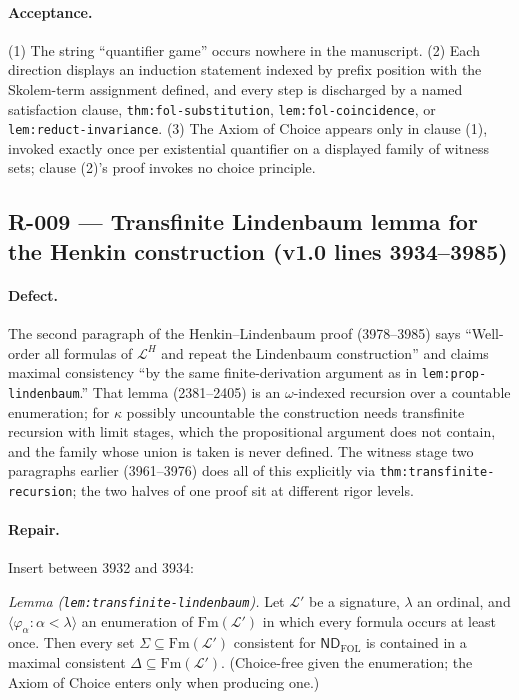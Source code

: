 \paragraph{Acceptance.}
(1) The string ``quantifier game'' occurs nowhere in the manuscript.  (2) Each
direction displays an induction statement indexed by prefix position with the
Skolem-term assignment defined, and every step is discharged by a named
satisfaction clause, \texttt{thm:fol-substitution},
\texttt{lem:fol-coincidence}, or \texttt{lem:reduct-invariance}.  (3) The Axiom
of Choice appears only in clause (1), invoked exactly once per existential
quantifier on a displayed family of witness sets; clause (2)'s proof invokes no
choice principle.

\subsection*{R-009 --- Transfinite Lindenbaum lemma for the Henkin construction (v1.0 lines 3934--3985)}

\paragraph{Defect.}
The second paragraph of the Henkin--Lindenbaum proof (3978--3985) says
``Well-order all formulas of \(\mathcal{L}^{H}\) and repeat the Lindenbaum
construction'' and claims maximal consistency ``by the same finite-derivation
argument as in \texttt{lem:prop-lindenbaum}.''  That lemma (2381--2405) is an
\(\omega\)-indexed recursion over a countable enumeration; for
\(\kappa\) possibly uncountable the construction needs transfinite recursion
with limit stages, which the propositional argument does not contain, and the
family whose union is taken is never defined.  The witness stage two paragraphs
earlier (3961--3976) does all of this explicitly via
\texttt{thm:transfinite-recursion}; the two halves of one proof sit at
different rigor levels.

\paragraph{Repair.}
Insert between 3932 and 3934:

\emph{Lemma (\texttt{lem:transfinite-lindenbaum}).}  Let \(\mathcal{L}'\) be a
signature, \(\lambda\) an ordinal, and
\(\langle\varphi_\alpha:\alpha<\lambda\rangle\) an enumeration of
\(\mathrm{Fm}(\mathcal{L}')\) in which every formula occurs at least once.
Then every set \(\Sigma\subseteq\mathrm{Fm}(\mathcal{L}')\) consistent for
\(\mathsf{ND}_{\mathrm{FOL}}\) is contained in a maximal consistent
\(\Delta\subseteq\mathrm{Fm}(\mathcal{L}')\).  (Choice-free given the
enumeration; the Axiom of Choice enters only when producing one.)

